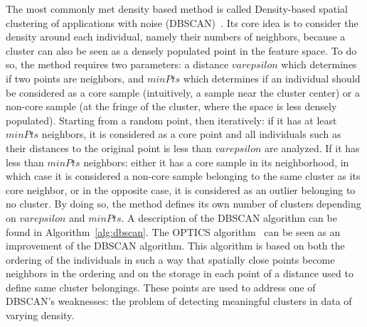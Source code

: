 The most commonly met density based method is called Density-based spatial clustering of applications with noise (DBSCAN)~\cite{ester1996density}. Its core idea is to consider the density around each individual, namely their numbers of neighbors, because a cluster can also be seen as a densely populated point in the feature space. To do so, the method requires two parameters: a distance $varepsilon$ which determines if two points are neighbors, and $minPts$ which determines if an individual should be considered as a core sample (intuitively, a sample near the cluster center) or a non-core sample (at the fringe of the cluster, where the space is less densely populated). Starting from a random point, then iteratively: if it has at least $minPts$ neighbors, it is considered as a core point and all individuals such as their distances to the original point is less than $varepsilon$ are analyzed. If it has less than $minPts$ neighbors: either it has a core sample in its neighborhood, in which case it is considered a non-core sample belonging to the same cluster as its core neighbor, or in the opposite case, it is considered as an outlier belonging to no cluster. By doing so, the method defines its own number of clusters depending on $varepsilon$ and $minPts$. A description of the DBSCAN algorithm can be found in Algorithm~\ref{alg:dbscan}. The OPTICS algorithm~\cite{ankerst1999optics} can be seen as an improvement of the DBSCAN algorithm. This algorithm is based on both the ordering of the individuals in such a way that spatially close points become neighbors in the ordering and on the storage in each point of a distance used to define same cluster belongings. These points are used to address one of DBSCAN's weaknesses: the problem of detecting meaningful clusters in data of varying density.

